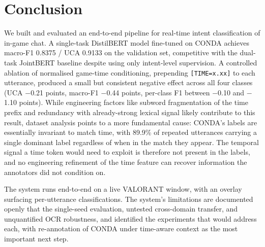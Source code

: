 \documentclass[a4paper,10.5pt,twoside]{article}
\begin{document}
\section{Conclusion}\label{sec:conclusion}

We built and evaluated an end-to-end pipeline for real-time intent classification of in-game chat. A single-task DistilBERT model fine-tuned on CONDA achieves macro-F1 0.8375 / UCA 0.9133 on the validation set, competitive with the dual-task JointBERT baseline despite using only intent-level supervision. A controlled ablation of normalised game-time conditioning, prepending \texttt{[TIME=x.xx]} to each utterance, produced a small but consistent negative effect across all four classes (UCA $-$0.21 points, macro-F1 $-$0.44 points, per-class F1 between $-$0.10 and $-$1.10 points). While engineering factors like subword fragmentation of the time prefix and redundancy with already-strong lexical signal likely contribute to this result, dataset analysis points to a more fundamental cause: CONDA's labels are essentially invariant to match time, with 89.9\% of repeated utterances carrying a single dominant label regardless of when in the match they appear. The temporal signal a time token would need to exploit is therefore not present in the labels, and no engineering refinement of the time feature can recover information the annotators did not condition on.

The system runs end-to-end on a live VALORANT window, with an overlay surfacing per-utterance classifications. The system's limitations are documented openly that the single-seed evaluation, untested cross-domain transfer, and unquantified OCR robustness, and identified the experiments that would address each, with re-annotation of CONDA under time-aware context as the most important next step.


\nocite{*}
\printbibliography[title={References}]
\end{document}
